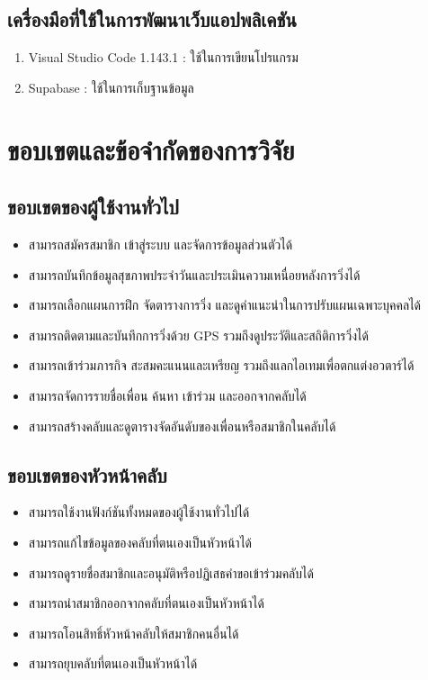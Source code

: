 \subsection{เครื่องมือที่ใช้ในการพัฒนาเว็บแอปพลิเคชัน}
\begin{enumerate}[label=(\arabic*)]
    \item Visual Studio Code 1.143.1 : ใช้ในการเขียนโปรแกรม
    \item Supabase : ใช้ในการเก็บฐานข้อมูล
\end{enumerate}

\section{ขอบเขตและข้อจำกัดของการวิจัย}
\subsection{ขอบเขตของผู้ใช้งานทั่วไป}
\begin{itemize}[label={-}]
    \item สามารถสมัครสมาชิก เข้าสู่ระบบ และจัดการข้อมูลส่วนตัวได้
    \item สามารถบันทึกข้อมูลสุขภาพประจำวันและประเมินความเหนื่อยหลังการวิ่งได้
    \item สามารถเลือกแผนการฝึก จัดตารางการวิ่ง และดูคำแนะนำในการปรับแผนเฉพาะบุคคลได้
    \item สามารถติดตามและบันทึกการวิ่งด้วย GPS รวมถึงดูประวัติและสถิติการวิ่งได้
    \item สามารถเข้าร่วมภารกิจ สะสมคะแนนและเหรียญ รวมถึงแลกไอเทมเพื่อตกแต่งอวตาร์ได้
    \item สามารถจัดการรายชื่อเพื่อน ค้นหา เข้าร่วม และออกจากคลับได้
    \item สามารถสร้างคลับและดูตารางจัดอันดับของเพื่อนหรือสมาชิกในคลับได้
\end{itemize}

\subsection{ขอบเขตของหัวหน้าคลับ}
\begin{itemize}[label={-}]
    \item สามารถใช้งานฟังก์ชันทั้งหมดของผู้ใช้งานทั่วไปได้
    \item สามารถแก้ไขข้อมูลของคลับที่ตนเองเป็นหัวหน้าได้
    \item สามารถดูรายชื่อสมาชิกและอนุมัติหรือปฏิเสธคำขอเข้าร่วมคลับได้
    \item สามารถนำสมาชิกออกจากคลับที่ตนเองเป็นหัวหน้าได้
    \item สามารถโอนสิทธิ์หัวหน้าคลับให้สมาชิกคนอื่นได้
    \item สามารถยุบคลับที่ตนเองเป็นหัวหน้าได้
\end{itemize}

